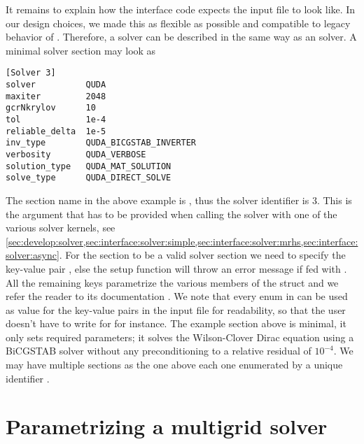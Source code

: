 It remains to explain how the interface code expects the input file to look like.
In our design choices, we made this as flexible as possible and compatible to legacy behavior of \openqxd.
Therefore, a \quda solver can be described in the same way as an \openqcd solver.
A minimal solver section may look as
\begin{verbatim}
[Solver 3]
solver          QUDA
maxiter         2048
gcrNkrylov      10
tol             1e-4
reliable_delta  1e-5
inv_type        QUDA_BICGSTAB_INVERTER
verbosity       QUDA_VERBOSE
solution_type   QUDA_MAT_SOLUTION
solve_type      QUDA_DIRECT_SOLVE
\end{verbatim}
The section name in the above example is , thus the solver identifier is \num{3}.
This is the argument  that has to be provided when calling the solver with one of the various solver kernels, see \cref{sec:develop:solver,sec:interface:solver:simple,sec:interface:solver:mrhs,sec:interface:solver:async}.
For the section to be a valid \quda solver section we need to specify the key-value pair , else the setup function will throw an error message if fed with .
All the remaining keys parametrize the various members of the  struct and we refer the reader to its documentation \cite{QUDApaper,github:quda}.
We note that every enum in  can be used as value for the key-value pairs in the input file for readability, so that the user doesn't have to write  for  for instance.
The example section above is minimal, \ie it only sets required parameters; it solves the Wilson-Clover Dirac equation using a BiCGSTAB solver without any preconditioning to a relative residual of $10^{-4}$.
We may have multiple sections as the one above each one enumerated by a unique identifier .

\section{Parametrizing a multigrid solver}
\label{sec:running:multgrid}

